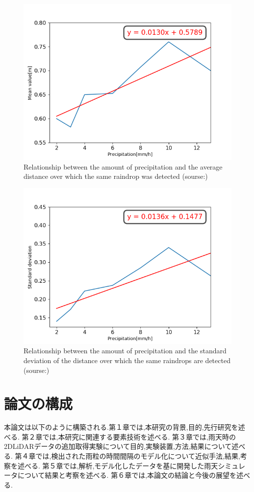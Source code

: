 \begin{figure}[h]
  \centering
  \includegraphics[keepaspectratio, scale=0.38]{images/png/4_3mean_kinji.png}
  \caption{Relationship between the amount of precipitation and the average distance over which the same raindrop was detected (sourse:\cite{mura})}
  \label{Fig:1.2}
\end{figure}

\begin{figure}[h]
  \centering
  \includegraphics[keepaspectratio, scale=0.38]{images/png/4_3std_kinji.png}
  \caption{Relationship between the amount of precipitation and the standard deviation of the distance over which the same raindrops are detected (sourse:\cite{mura})}
  \label{Fig:1.3}
\end{figure}


\newpage
\section{論文の構成}
本論文は以下のように構築される.第１章では,本研究の背景,目的,先行研究を述べる.
第２章では,本研究に関連する要素技術を述べる.
第３章では,雨天時の2DLiDARデータの追加取得実験について目的,実験装置,方法,結果について述べる.
第４章では,検出された雨粒の時間間隔のモデル化について近似手法,結果,考察を述べる.
第５章では,解析,モデル化したデータを基に開発した雨天シミュレータについて結果と考察を述べる.
第６章では,本論文の結論と今後の展望を述べる.

